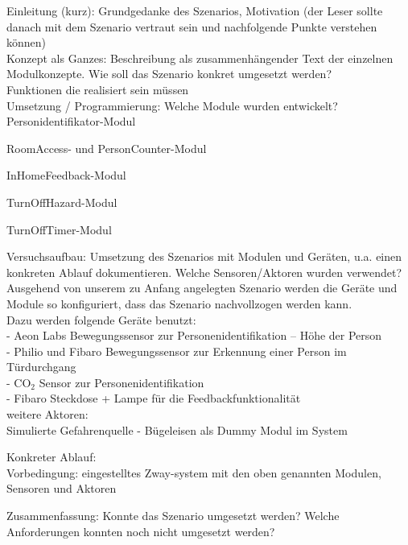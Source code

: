 Einleitung (kurz): Grundgedanke des Szenarios, Motivation (der Leser sollte danach mit dem Szenario vertraut sein und nachfolgende Punkte verstehen können)\\

Konzept als Ganzes: Beschreibung als zusammenhängender Text der einzelnen Modulkonzepte. Wie soll das Szenario konkret umgesetzt werden?\\

Funktionen die realisiert sein müssen\\

Umsetzung / Programmierung: Welche Module wurden entwickelt?\\

Personidentifikator-Modul

RoomAccess- und PersonCounter-Modul

InHomeFeedback-Modul



TurnOffHazard-Modul



TurnOffTimer-Modul



Versuchsaufbau: Umsetzung des Szenarios mit Modulen und Geräten, u.a. einen konkreten Ablauf dokumentieren. Welche Sensoren/Aktoren wurden verwendet?\\

Ausgehend von unserem zu Anfang angelegten Szenario werden die Geräte und Module so konfiguriert, dass das Szenario nachvollzogen werden kann.\\
Dazu werden folgende Geräte benutzt:\\
- Aeon Labs Bewegungssensor zur Personenidentifikation – Höhe der Person\\
- Philio und Fibaro Bewegungssensor zur Erkennung einer Person im Türdurchgang\\
- CO$_2$ Sensor zur Personenidentifikation\\
- Fibaro Steckdose + Lampe für die Feedbackfunktionalität\\

weitere Aktoren:\\
Simulierte Gefahrenquelle - Bügeleisen als Dummy Modul im System

Konkreter Ablauf:\\

Vorbedingung: eingestelltes Zway-system mit den oben genannten Modulen, Sensoren und Aktoren


Zusammenfassung: Konnte das Szenario umgesetzt werden? Welche Anforderungen konnten noch nicht umgesetzt werden?\\

